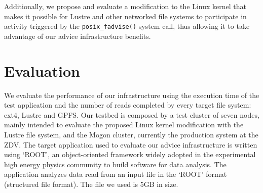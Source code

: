 \documentclass[conference]{IEEEtran}
\begin{document}
Additionally, we propose and evaluate a modification to the Linux kernel that makes it possible for Lustre and other networked file systems to participate in activity triggered by the \texttt{posix\_fadvise()} system call, thus allowing it to take advantage of our advice infrastructure benefits.

\section{Evaluation}
\label{sec: evaluation}
We evaluate the performance of our infrastructure using the execution time of the test application and the number of reads completed by every target file system: ext4, Lustre and GPFS. %
Our testbed is composed by a test cluster of seven nodes, mainly intended to evaluate the proposed Linux kernel modification with the Lustre file system, and the Mogon cluster, currently the production system at the ZDV. 
The target application used to evaluate our advice infrastructure is written using `ROOT', an object-oriented framework widely adopted in the experimental high energy physics community to build software for data analysis. The application analyzes data read from an input file in the `ROOT' format (structured file format). The file we used is 5GB in size.
\end{document}
